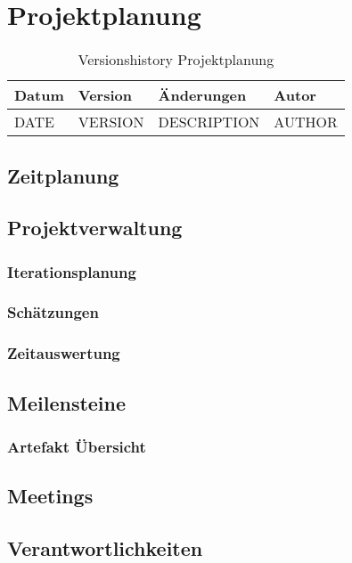 \chapter{Projektplanung}
\begin{table}[H]
	\centering
	\begin{tabularx}{\linewidth}{l l X l}
		\toprule 
		Datum & Version & Änderungen & Autor \\
		\midrule
		DATE & VERSION & DESCRIPTION & AUTHOR \\
		\bottomrule 
	\end{tabularx} 
	\caption{Versionshistory Projektplanung} 
\end{table}

\section{Zeitplanung} 

\section{Projektverwaltung} 


\subsection{Iterationsplanung} \label{phasen}

\subsection{Schätzungen}

\subsection{Zeitauswertung}

\section{Meilensteine} \label{milestones}

\subsection{Artefakt Übersicht}

\section{Meetings} \label{meeting} 

\section{Verantwortlichkeiten}

